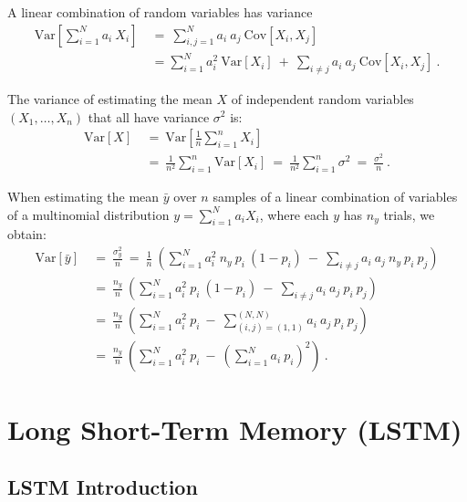 \documentclass{article}
\newcommand\VAR{\mathbf{\mathrm{Var}}}
\newcommand\COV{\mathbf{\mathrm{Cov}}}
\begin{document}
\begin{appendices}
A linear combination of random variables has variance
\begin{align}
 \VAR \left[ \sum_{i=1}^N a_i \ X_i\right] \ &= \ \sum_{i,j=1}^{N} a_i
 \ a_j\ \COV \left[ X_i,X_j \right] \\ \nonumber
 &=\sum_{i=1}^N a_i^2 \ \VAR \left[ X_i\right] \ + \ \sum_{i\not=j}a_i
 \ a_j\ \COV\left[ X_i,X_j \right] \ .
\end{align}


The variance of estimating the mean $X$ of independent random variables
$(X_1,\ldots,X_n)$ that all have variance $\sigma^2$ is:
\begin{align}
 \VAR \left[X \right] \ &= \
 \VAR \left[ \frac{1}{n} \sum_{i=1}^n X_i\right] \\ \nonumber
 &= \  \frac{1}{n^2} \sum_{i=1}^n\VAR \left[  X_i\right]
 \ = \  \frac{1}{n^2} \sum_{i=1}^n \sigma^2 \ = \ \frac{\sigma^2}{n} \ .
\end{align}


When estimating the mean $\bar{y}$ over $n$ samples
of a linear combination of variables of a
multinomial distribution $y=\sum_{i=1}^N a_i  X_i$, where each $y$ has
$n_y$ trials, we obtain:
\begin{align}
  \VAR \left[ \bar{y} \right] \ &= \ \frac{\sigma_y^2}{n} \ = \
  \frac{1}{n} \ \left( \sum_{i=1}^N a_i^2 \ n_y \ p_i \ (1-p_i) \ - \
  \sum_{i\not=j}a_i \ a_j \ n_y \ p_i \ p_j \right) \\ \nonumber
  &= \  \frac{n_y}{n} \ \left( \sum_{i=1}^N a_i^2  \ p_i \ (1-p_i) \ - \
  \sum_{i\not=j}a_i \ a_j \ p_i \ p_j \right) \\ \nonumber
  &= \ \frac{n_y}{n}  \ \left( \sum_{i=1}^N a_i^2 \ p_i  \ - \
    \sum_{(i,j)=(1,1)}^{(N,N)} a_i \
  a_j \ p_i \ p_j \right) \\ \nonumber
  &= \ \frac{n_y}{n}  \ \left( \sum_{i=1}^N a_i^2 \ p_i  \ - \
  \left( \sum_{i=1}^{N} a_i \  p_i\right)^2  \right) \ .
\end{align}

\section{Long Short-Term Memory (LSTM)}

\subsection{LSTM Introduction}



\end{appendices}
\end{document}
